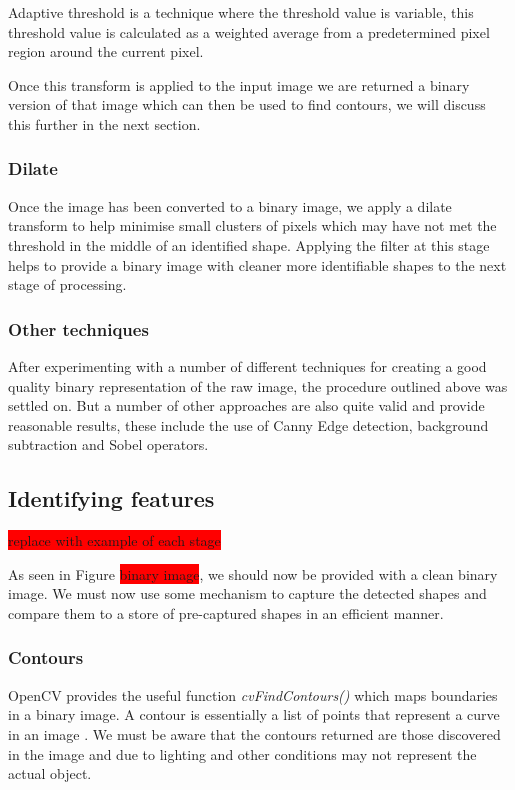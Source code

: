 Adaptive threshold is a technique where the threshold value is variable, this threshold value is calculated as a weighted average from a predetermined pixel region around the current pixel.

Once this transform is applied to the input image we are returned a binary version of that image which can then be used to find contours, we will discuss this further in the next section.


\subsubsection{Dilate}
Once the image has been converted to a binary image, we apply a dilate transform to help minimise small clusters of pixels which may have not met the threshold in the middle of an identified shape. Applying the filter at this stage helps to provide a binary image with cleaner more identifiable shapes to the next stage of processing.


\subsubsection{Other techniques}
After experimenting with a number of different techniques for creating a good quality binary representation of the raw image, the procedure outlined above was settled on. But a number of other approaches are also quite valid and provide reasonable results, these include the use of Canny Edge detection, background subtraction and Sobel operators.


\subsection{Identifying features}

\colorbox{red}{replace with example of each stage}

As seen in Figure \colorbox{red}{binary image}, we should now be provided with a clean binary image. We must now use some mechanism to capture the detected shapes and compare them to a store of pre-captured shapes in an efficient manner. 

\subsubsection{Contours}
OpenCV provides the useful function \emph{cvFindContours()} which maps boundaries in a binary image. A contour is essentially a list of points that represent a curve in an image \cite{bradski08}. We must be aware that the contours returned are those discovered in the image and due to lighting and other conditions may not represent the actual object.

